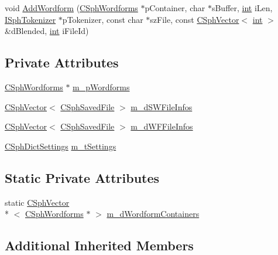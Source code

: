 \begin{DoxyCompactItemize}
void \hyperlink{structCSphTemplateDictTraits_a6b11442a644869ea882b691bf69ce2a6}{Add\-Wordform} (\hyperlink{structCSphWordforms}{C\-Sph\-Wordforms} $\ast$p\-Container, char $\ast$s\-Buffer, \hyperlink{sphinxexpr_8cpp_a4a26e8f9cb8b736e0c4cbf4d16de985e}{int} i\-Len, \hyperlink{classISphTokenizer}{I\-Sph\-Tokenizer} $\ast$p\-Tokenizer, const char $\ast$sz\-File, const \hyperlink{classCSphVector}{C\-Sph\-Vector}$<$ \hyperlink{sphinxexpr_8cpp_a4a26e8f9cb8b736e0c4cbf4d16de985e}{int} $>$ \&d\-Blended, \hyperlink{sphinxexpr_8cpp_a4a26e8f9cb8b736e0c4cbf4d16de985e}{int} i\-File\-Id)
\end{DoxyCompactItemize}
\subsection*{Private Attributes}
\begin{DoxyCompactItemize}
\item 
\hyperlink{structCSphWordforms}{C\-Sph\-Wordforms} $\ast$ \hyperlink{structCSphTemplateDictTraits_af1c9ed3298346175146080fe435d841a}{m\-\_\-p\-Wordforms}
\item 
\hyperlink{classCSphVector}{C\-Sph\-Vector}$<$ \hyperlink{structCSphSavedFile}{C\-Sph\-Saved\-File} $>$ \hyperlink{structCSphTemplateDictTraits_ad930be8d04cb5236ca9e602385bda3c1}{m\-\_\-d\-S\-W\-File\-Infos}
\item 
\hyperlink{classCSphVector}{C\-Sph\-Vector}$<$ \hyperlink{structCSphSavedFile}{C\-Sph\-Saved\-File} $>$ \hyperlink{structCSphTemplateDictTraits_a69854e5330a1aaa154b085432476157a}{m\-\_\-d\-W\-F\-File\-Infos}
\item 
\hyperlink{structCSphDictSettings}{C\-Sph\-Dict\-Settings} \hyperlink{structCSphTemplateDictTraits_a1df7a3c269a8219780046fd7017ee93a}{m\-\_\-t\-Settings}
\end{DoxyCompactItemize}
\subsection*{Static Private Attributes}
\begin{DoxyCompactItemize}
\item 
static \hyperlink{classCSphVector}{C\-Sph\-Vector}\\*
$<$ \hyperlink{structCSphWordforms}{C\-Sph\-Wordforms} $\ast$ $>$ \hyperlink{structCSphTemplateDictTraits_a3cddb227030065e7229ce6c9619b51f8}{m\-\_\-d\-Wordform\-Containers}
\end{DoxyCompactItemize}
\subsection*{Additional Inherited Members}


